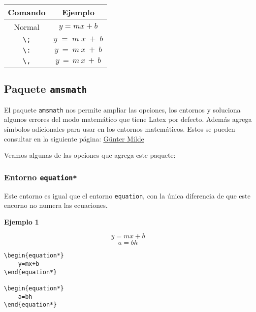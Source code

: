 \begin{center}
	\begin{tabular}{|>{\ttfamily}c|c|}
		\hline
		\textrm{Comando} & Ejemplo\\
		\hline	
		\textrm{Normal} & $y=mx+b$\\
		\hline	
		\verb|\;| & $y\;=\;m\;x\;+\;b$\\
		\hline	
		\verb|\:| & $y\:=\:m\:x\:+\:b$\\
		\hline	
		\verb|\,| & $y\,=\,m\,x\,+\,b$\\
		\hline
	\end{tabular}
\end{center}

\subsection{Paquete \texttt{amsmath}}

El paquete \texttt{amsmath} nos permite ampliar las opciones, los entornos y soluciona algunos errores del modo matemático que tiene Latex por defecto. Además agrega símbolos adicionales para usar en los entornos matemáticos. Estos se pueden consultar en la siguiente página: \href{http://milde.users.sourceforge.net/LUCR/Math/mathpackages/amsmath-symbols.pdf}{\textcolor{light-blue}{Günter Milde}}


Veamos algunas de las opciones que agrega este paquete:

\subsubsection{Entorno \texttt{equation*}}

Este entorno es igual que el entorno \texttt{equation}, con la única diferencia de que este encorno no numera las ecuaciones.

\textbf{Ejemplo 1}

\begin{equation*}
y=mx+b
\end{equation*}
\begin{equation*}
a=bh
\end{equation*}

\begin{myquote}
	\begin{lstlisting}
\begin{equation*}
	y=mx+b
\end{equation*}
	
\begin{equation*}
	a=bh
\end{equation*}
	\end{lstlisting}
\end{myquote}


